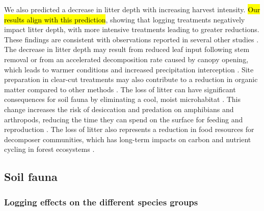 We also predicted a decrease in litter depth with increasing harvest intensity. 
\hl{Our results align with this prediction}, showing that logging treatments negatively impact litter depth, with more intensive treatments leading to greater reductions. 
These findings are consistent with observations reported in several other studies \citep{Marshall2000Impactsforest,Mazerolle2021Woodlandsalamander}. 
The decrease in litter depth may result from reduced leaf input following stem removal or from an accelerated decomposition rate caused by canopy opening, 
which leads to warmer conditions and increased precipitation interception \citep{Fierer2005LitterQuality,Butenschoen2011Interactiveeffects,Ameray2021Forestcarbon}. 
Site preparation in clear-cut treatments may also contribute to a reduction in organic matter compared to other methods \citep{Prevost1992Effetsscarifiage}. 
The loss of litter can have significant consequences for soil fauna by eliminating a cool, moist microhabitat \citep{spotilaRoleTemperatureWater1972,groverInfluenceCoverMoisture1998a,Niemela2007effectsforestry}. 
This change increases the risk of desiccation and predation on amphibians and arthropods, reducing the time they can spend on the surface for feeding and reproduction \citep{deMaynadier1995relationshipforest,koivula.LeafLitterSmallscale1999,Walton2013Topdownregulation}. 
The loss of litter also represents a reduction in food resources for decomposer communities, which has long-term impacts on carbon and nutrient cycling in forest ecosystems \citep{Handa2014Consequencesbiodiversity}. 


\subsection*{Soil fauna}
\label{disc:soil_fauna}

\subsubsection*{Logging effects on the different species groups}
\label{disc:logging_effects}


